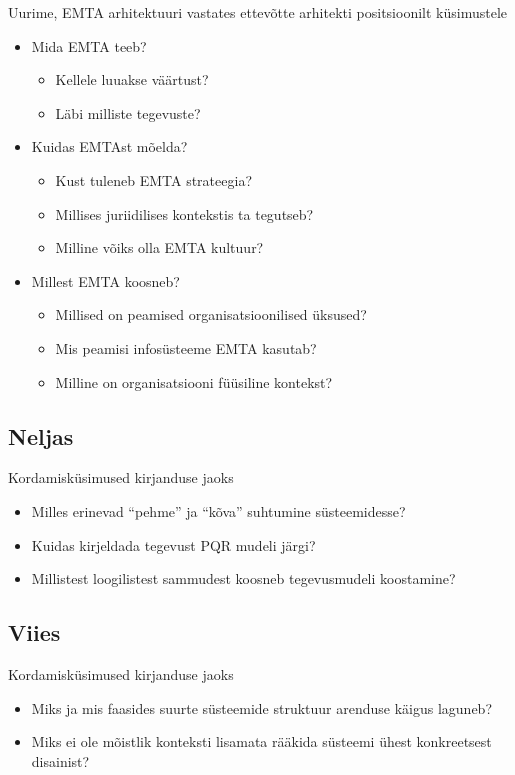 \documentclass[nobib]{tufte-handout}
\begin{document}
Uurime, EMTA arhitektuuri vastates ettevõtte arhitekti positsioonilt küsimustele
\begin{itemize}
	\item Mida EMTA teeb?
	\begin{itemize}
		\item Kellele luuakse väärtust?
		\item Läbi milliste tegevuste?
	\end{itemize}
	\item Kuidas EMTAst mõelda?
	\begin{itemize}
		\item Kust tuleneb EMTA strateegia?
		\item Millises juriidilises kontekstis ta tegutseb?
		\item Milline võiks olla EMTA kultuur?
	\end{itemize}
	\item Millest EMTA koosneb?
	\begin{itemize}
		\item Millised on peamised organisatsioonilised üksused?
		\item Mis peamisi infosüsteeme EMTA kasutab?
		\item Milline on organisatsiooni füüsiline kontekst?
	\end{itemize}
\end{itemize}

\subsection{Neljas}
Kordamisküsimused kirjanduse jaoks
\begin{itemize}
	\item Milles erinevad \enquote{pehme} ja \enquote{kõva} suhtumine süsteemidesse?
	\item Kuidas kirjeldada tegevust PQR mudeli järgi?
	\item Millistest loogilistest sammudest koosneb tegevusmudeli koostamine?
\end{itemize}

\subsection{Viies}
Kordamisküsimused kirjanduse jaoks
\begin{itemize}
	\item Miks ja mis faasides suurte süsteemide struktuur arenduse käigus laguneb?
	\item Miks ei ole mõistlik konteksti lisamata rääkida süsteemi ühest konkreetsest disainist?
\end{itemize}
\end{document}
